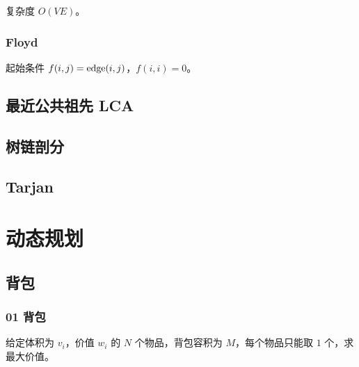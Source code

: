 \documentclass{probook}
\begin{document}
\begin{multicols}{2}
复杂度 $O(VE)$。



\subsection{Floyd}

起始条件 $f(i,j)={\rm edge}(i,j)$，$f(i,i)=0$。



\section{最近公共祖先 LCA}



\section{树链剖分}



\section{Tarjan}









\chapter{动态规划}

\section{背包}

\subsection{01 背包}

给定体积为 $v_i$，价值 $w_i$ 的 $N$ 个物品，背包容积为 $M$，每个物品只能取 $1$ 个，求最大价值。




\end{multicols}
\end{document}
